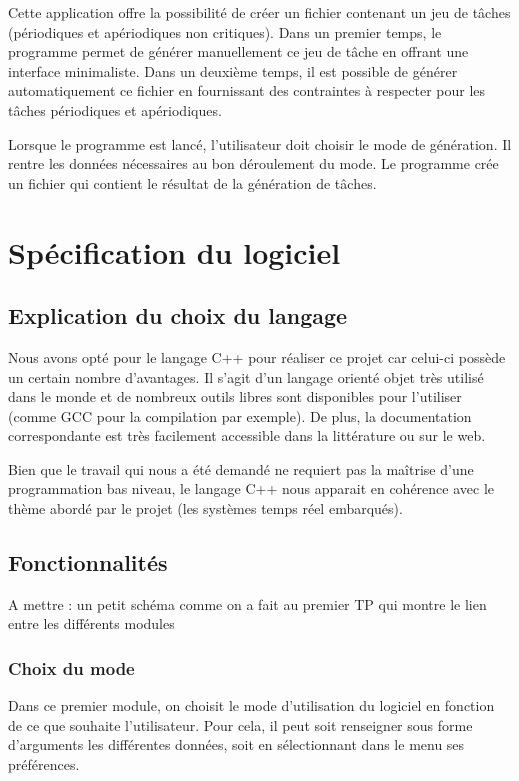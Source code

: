 	Cette application offre la possibilité de créer un fichier contenant un jeu de tâches (périodiques et apériodiques non critiques).
	Dans un premier temps, le programme permet de générer manuellement ce jeu de tâche en offrant une interface minimaliste.
	Dans un deuxième temps, il est possible de générer automatiquement ce fichier en fournissant des contraintes à respecter pour les tâches périodiques et apériodiques.
	
	
	Lorsque le programme est lancé, l’utilisateur doit choisir le mode de génération. Il rentre les données nécessaires au bon déroulement du mode. Le programme crée un fichier qui contient le résultat de la génération de tâches.


	\section{Spécification du logiciel}

		\subsection{Explication du choix du langage}
	
			\label{sec:langage}
			Nous avons opté pour le langage C++ pour réaliser ce projet car celui-ci possède un certain nombre d'avantages. Il s'agit d'un langage orienté objet très utilisé dans le monde et de nombreux outils libres sont disponibles pour l'utiliser (comme GCC pour la compilation par exemple). De plus, la documentation correspondante est très facilement accessible dans la littérature ou sur le web.
		
			Bien que le travail qui nous a été demandé ne requiert pas la maîtrise d'une programmation bas niveau, le langage C++ nous apparait en cohérence avec le thème abordé par le projet (les systèmes temps réel embarqués).

		\subsection{Fonctionnalités}

			\Huge
			A mettre : un petit schéma comme on a fait au premier TP qui montre le lien entre les différents modules
			\normalsize
		    
			\subsubsection{Choix du mode}
				Dans ce premier module, on choisit le mode d’utilisation du logiciel en fonction de ce que souhaite l’utilisateur. Pour cela, il peut soit renseigner sous forme d’arguments les différentes données, soit en sélectionnant dans le menu ses préférences. \\

